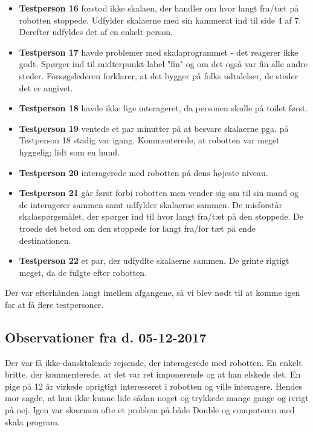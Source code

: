 \begin{itemize}
\item \textbf{Testperson 16} forstod ikke skalaen, der handler om hvor langt fra/tæt på robotten stoppede. Udfylder skalaerne med sin kammerat ind til side 4 af 7. Derefter udfyldes det af en enkelt person.
\item \textbf{Testperson 17} havde problemer med skalaprogrammet - det reagerer ikke godt. Spørger ind til midterpunkt-label "fin" og om det også var fin alle andre steder. Forsøgslederen forklarer, at det bygger på folks udtalelser, de steder det er angivet.
\item \textbf{Testperson 18} havde ikke lige interageret, da personen skulle på toilet først.
\item 	\textbf{Testperson 19} ventede et par minutter på at besvare skalaerne pga. på Testperson 18 stadig var igang. Kommenterede, at robotten var meget hyggelig; lidt som en hund.
\item 	\textbf{Testperson 20} interagerede med robotten på dens højeste niveau.
\item \textbf{Testperson 21} går først forbi robotten men vender sig om til sin mand og de interagerer sammen samt udfylder skalaerne sammen. De misforstår skalaspørgsmålet, der spørger ind til hvor langt fra/tæt på den stoppede. De troede det betød om den stoppede for langt fra/for tæt på ende destinationen.
\item \textbf{Testperson 22} et par, der udfydlte skalaerne sammen. De grinte rigtigt meget, da de fulgte efter robotten.
\end{itemize}

Der var efterhånden langt imellem afgangene, så vi blev nødt til at komme igen for at få flere testpersoner.

\subsection{Observationer fra d. 05-12-2017}
Der var få ikke-dansktalende rejsende, der interagerede med robotten. En enkelt britte, der kommenterede, at det var ret imponerende og at han elskede det. En pige på 12 år virkede oprigtigt interesseret i robotten og ville interagere. Hendes mor sagde, at hun ikke kunne lide sådan noget og trykkede mange gange og ivrigt på nej.
Igen var skærmen ofte et problem på både Double og computeren med skala program.

